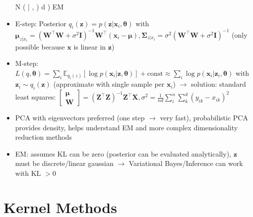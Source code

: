 \documentclass[11pt]{scrartcl}
\begin{document}
\begin{itemize}
        N (  | ,  ) d  ) \rightarrow \) EM
    \item E-step: Posterior \( q_i ( \bm{z} ) = p ( \bm{z} | \bm{x}_i, \bm{\theta} ) \) with 
        \( \bm{\mu}_{z | x_i} = ( \bm{W}^\top \bm{W} + \sigma^2 \bm{I} )^{- 1} \bm{W}^\top 
        ( \bm{x}_i - \bm{\mu} ), \bm{\Sigma}_{z | x_i} = 
        \sigma^2 ( \bm{W}^\top \bm{W} + \sigma^2 \bm{I} )^{- 1} \) (only possible because 
        \( \bm{x} \) is linear in \( \bm{z} \))
    \item M-step: \( L ( q, \bm{\theta} ) = 
        \sum_i \mathbb{E}_{q_i ( z )} [ \log p( \bm{x}_i | \bm{z}, \bm{\theta} ) ] + 
        \mathrm{const} \approx \sum_i \log p ( \bm{x}_i | \bm{z}_i, \bm{\theta} ) \) with 
        \( \bm{z}_i \sim q_i ( \bm{z} ) \) (approximate with single sample per \( \bm{x}_i \)) \( \rightarrow \) 
        solution: standard least squares: \( \begin{bmatrix}
            \bm{\mu} \\
            \bm{W}
        \end{bmatrix} = ( \bm{Z}^\top \bm{Z} )^{- 1} \bm{Z}^\top \bm{X}, \sigma^2 = 
        \frac{1}{n d} \sum_i^n \sum_k^d ( y_{ik} - x_{ik} )^2 \)
    \item PCA with eigenvectors preferred (one step \( \rightarrow \) very fast), probabilistic 
        PCA provides density, helps understand EM and more complex dimensionality reduction 
        methods
    \item EM: assumes KL can be zero (posterior can be evaluated analytically), \( \bm{z} \) 
        must be discrete/linear gaussian \( \rightarrow \) Variational Bayes/Inference can work 
        with KL \( > 0 \)
\end{itemize}

\section{Kernel Methods}
\end{document}
